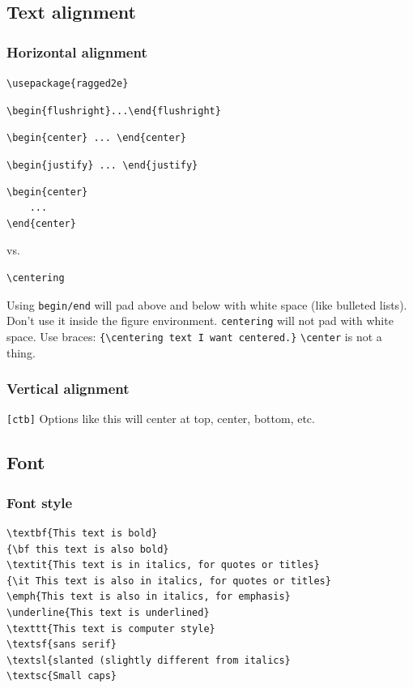 \documentclass{article}
\begin{document}
\subsection{Text alignment}
\subsubsection{Horizontal alignment}
\verb|\usepackage{ragged2e}|
\begin{itemize*}
    \item \verb|\begin{flushright}...\end{flushright}|
    \item \verb|\begin{center} ... \end{center}|
    \item \verb|\begin{justify} ... \end{justify}|
\end{itemize*}

\begin{verbatim}
\begin{center}
    ...
\end{center}
\end{verbatim}
vs.
\begin{verbatim}
\centering
\end{verbatim}

Using \verb|begin/end| will pad above and
below with white space (like bulleted lists). Don't use it inside the figure
environment. \verb|centering| will not pad with white space.
Use braces: \verb|{\centering text I want centered.}|
\verb|\center| is not a thing.

\subsubsection{Vertical alignment}
\verb|[ctb]| Options like this will center at top, center, bottom, etc.

\subsection{Font}
\subsubsection{Font style}
\begin{verbatim}
\textbf{This text is bold}
{\bf this text is also bold}
\textit{This text is in italics, for quotes or titles}
{\it This text is also in italics, for quotes or titles}
\emph{This text is also in italics, for emphasis}
\underline{This text is underlined}
\texttt{This text is computer style}
\textsf{sans serif}
\textsl{slanted (slightly different from italics}
\textsc{Small caps}
\end{verbatim}
\end{document}

